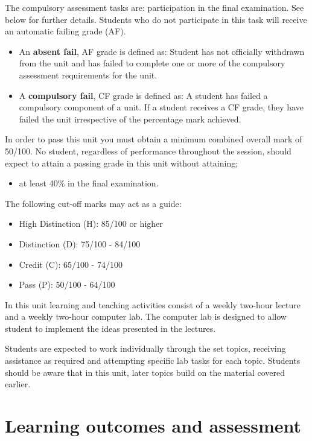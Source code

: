 \documentclass[a4paper,oneside]{book}
\begin{document}
The compulsory assessment tasks are: participation in the final
examination. See below for further details. Students who do not
participate in this task will receive an automatic failing grade
(AF).
\begin{itemize}

\item An \textbf{absent fail}, AF grade is defined as: Student has not
officially withdrawn from the unit and has failed to complete one or
more of the compulsory assessment requirements for the unit.

\item A \textbf{compulsory fail}, CF grade is defined as: A student has
failed a compulsory component of a unit. If a student receives a CF
grade, they have failed the unit irrespective of the percentage mark
achieved.
\end{itemize}
In order to pass this unit you must obtain a minimum combined overall
mark of 50/100. No student, regardless of performance throughout the
session, should expect to attain a passing grade in this unit without
attaining;
\begin{itemize}
\item at least 40\% in the final examination.
\end{itemize}
The following cut-off marks may act as a guide:
\begin{itemize}
\item High Distinction (H):            85/100 or higher
\item Distinction (D):                 75/100 - 84/100
\item Credit (C):                      65/100 - 74/100
\item Pass (P):                        50/100 - 64/100
\end{itemize}
In this unit learning and teaching activities consist of a weekly
two-hour lecture and a weekly two-hour computer lab. The computer lab
is designed to allow student to implement the ideas presented in the
lectures.

Students are expected to work individually through the set topics,
receiving assistance as required and attempting specific lab
tasks for each topic. Students should be aware that in this unit,
later topics build on the material covered earlier.


\section{Learning outcomes and assessment}
\end{document}
